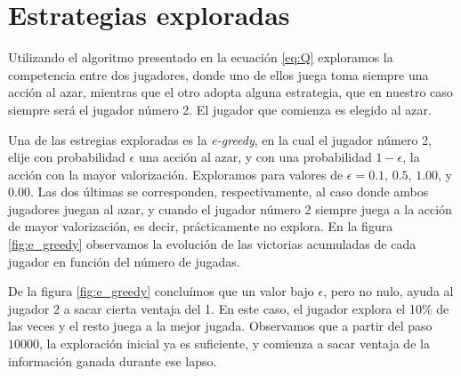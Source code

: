 \documentclass[11pt, spanish]{article}
\begin{document}
\section{Estrategias exploradas}
\par Utilizando el algoritmo presentado en la ecuación \ref{eq:Q} exploramos la competencia entre dos jugadores, donde uno de ellos juega toma siempre una acción al azar, mientras que el otro adopta alguna estrategia, que en nuestro caso siempre será el jugador número 2. El jugador que comienza es elegido al azar.
\par Una de las estregias exploradas es la \emph{e-greedy}, en la cual el jugador número 2, elije con probabilidad $\epsilon$ una acción al azar, y con una probabilidad $1-\epsilon$, la acción con la mayor valorización. Exploramos para valores de $\epsilon = 0.1$, $0.5$, $1.00$, y $0.00$. Las dos últimas se corresponden, respectivamente, al caso donde ambos jugadores juegan al azar, y cuando el jugador número 2 siempre juega a la acción de mayor valorización, es decir, prácticamente no explora. En la figura \ref{fig:e_greedy} observamos la evolución de las victorias acumuladas de cada jugador en función del número de jugadas.
\par De la figura \ref{fig:e_greedy} concluímos que un valor bajo $\epsilon$, pero no nulo, ayuda al jugador 2 a sacar cierta ventaja del 1. En este caso, el jugador explora el 10\% de las veces y el resto juega a la mejor jugada. Observamos que a partir del paso $10000$, la exploración inicial ya es suficiente, y comienza a sacar ventaja de la información ganada durante ese lapso. 
\end{document}
